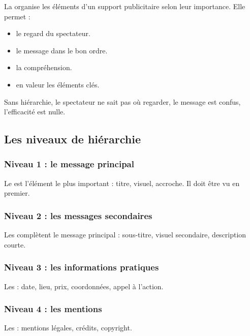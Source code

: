 La  organise les éléments d'un support publicitaire selon leur importance. Elle permet :

\begin{itemize}
    \item {} le regard du spectateur.
    \item {} le message dans le bon ordre.
    \item {} la compréhension.
    \item {} en valeur les éléments clés.
\end{itemize}

Sans hiérarchie, le spectateur ne sait pas où regarder, le message est confus, l'efficacité est nulle.

\subsection{Les niveaux de hiérarchie}

\subsubsection{Niveau 1 : le message principal}

Le  est l'élément le plus important : titre, visuel, accroche. Il doit être vu en premier.

\subsubsection{Niveau 2 : les messages secondaires}

Les  complètent le message principal : sous-titre, visuel secondaire, description courte.

\subsubsection{Niveau 3 : les informations pratiques}

Les  : date, lieu, prix, coordonnées, appel à l'action.

\subsubsection{Niveau 4 : les mentions}

Les  : mentions légales, crédits, copyright.

